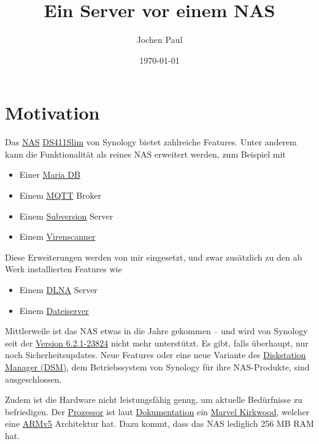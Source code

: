 \documentclass[12pt,a4paper,ngerman]{article}
\author{Jochen Paul}
\title{Ein Server vor einem NAS}
\date{\today}
\begin{document}
\clearpage\maketitle
\thispagestyle{empty}
\clearpage

\thispagestyle{fancy}
\clearpage
\tableofcontents
{}
\clearpage

\section{Motivation}
Das \href{https://de.wikipedia.org/wiki/Network_Attached_Storage}{NAS}
\href{https://www.synology.com/en-global/company/news/article/Synology_Unveils_DiskStation_DS411slim}{DS411Slim}
von Synology bietet zahlreiche Features. Unter anderem kann die Funktionalität
als reines NAS erweitert werden, zum Beispiel mit

\begin{itemize}
    \item Einer \href{https://de.wikipedia.org/wiki/MariaDB}{Maria DB}
    \item Einem \href{https://de.wikipedia.org/wiki/MQTT}{MQTT} Broker
    \item Einem \href{https://de.wikipedia.org/wiki/Subversion}{Subversion} Server
    \item Einem \href{https://de.wikipedia.org/wiki/Antivirenprogramm}{Virenscanner}
\end{itemize}

Diese Erweiterungen werden von mir eingesetzt, und zwar zusätzlich zu den ab
Werk installierten Features wie

\begin{itemize}
    \item Einem \href{https://de.wikipedia.org/wiki/Digital_Living_Network_Alliance}{DLNA} Server
    \item Einem \href{https://de.wikipedia.org/wiki/Dateiserver}{Dateiserver}
\end{itemize}

Mittlerweile ist das NAS etwas in die Jahre gekommen -- und wird von Synology
seit der
\href{https://www.synology.com/de-de/releaseNote/DS411slim}{Version 6.2.1-23824}
nicht mehr unterstützt. Es gibt, falls überhaupt, nur noch Sicherheitsupdates.
Neue Features oder eine neue Variante des
\href{https://www.synology.com/de-de/dsm}{Diskstation Manager (DSM)},
dem Betriebssystem von Synology für ihre NAS-Produkte, sind ausgeschlossen.

Zudem ist die Hardware nicht leistungsfähig genug, um aktuelle Bedürfnisse zu
befriedigen. Der \href{https://de.wikipedia.org/wiki/Prozessor}{Prozessor} ist
laut
\href{https://global.download.synology.com/download/Document/DataSheet/DiskStation/11-year/DS411slim/Synology_DS411slim_Data_Sheet_enu.pdf}{Dokumentation}
ein
\href{https://www.synology-wiki.de/index.php/Welchen_Prozessortyp_besitzt_mein_System%3F}{Marvel Kirkwood},
welcher eine \href{https://de.wikipedia.org/wiki/ARM-Architektur}{ARMv5}
Architektur hat. Dazu kommt, dass das NAS lediglich 256 MB RAM hat.
\end{document}
